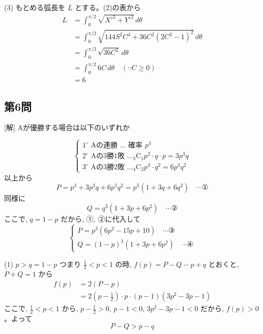 \documentclass[../main.tex]{subfiles}
\begin{document}
(3) もとめる弧長を $L$ とする。(2)の表から
\[
  \begin{aligned}
    L &= \int_0^{\pi/2} \sqrt{X'^2 + Y'^2} \, d\theta \\
    &= \int_0^{\pi/2} \sqrt{144 S^2 C^4 + 36 C^2 (2C^2 - 1)^2} \, d\theta \\
    &= \int_0^{\pi/2} \sqrt{36 C^2} \, d\theta \\
    &= \int_0^{\pi/2} 6 C \, d\theta \quad (\because C \ge 0) \\
    &= 6
  \end{aligned}
\]

\subsection*{第6問}

[解] Aが優勝する場合は以下のいずれか

\[
  \begin{cases}
    1^\circ \text{ Aの連勝 } \dots \text{ 確率 } p^3 \\
    2^\circ \text{ Aの3勝1敗 } \dots {}_3\text{C}_1 p^2 \cdot q \cdot p = 3p^3 q \\
    3^\circ \text{ Aの3勝2敗 } \dots {}_4\text{C}_2 p^3 \cdot q^2 = 6p^3 q^2
  \end{cases}
\]
以上から
\[
  P = p^3 + 3p^3 q + 6p^3 q^2 = p^3 (1 + 3q + 6q^2) \quad \cdots \text{①}
\]
同様に
\[
  Q = q^3 (1 + 3p + 6p^2) \quad \cdots \text{②}
\]
ここで, $q = 1-p$ だから, ①, ②に代入して
\[
  \begin{cases}
    P = p^3 (6p^2 - 15p + 10) \quad \cdots \text{③} \\
    Q = (1-p)^3 (1 + 3p + 6p^2) \quad \cdots \text{④}
  \end{cases}
\]

(1) $p > q = 1-p$ つまり $\frac{1}{2} < p < 1$ の時, $f(p) = P - Q - p + q$ とおくと, $P+Q = 1$ から
\[
  \begin{aligned}
    f(p) &= 2(P-p) \\
    &= 2\left(p - \frac{1}{2}\right) \cdot p \cdot (p-1) (3p^2 - 3p - 1)
  \end{aligned}
\]
ここで, $\frac{1}{2} < p < 1$ から, $p - \frac{1}{2} > 0$, $p-1 < 0$, $3p^2 - 3p - 1 < 0$ だから, $f(p) > 0$。よって
\[
  P - Q > p - q
\]
\end{document}
